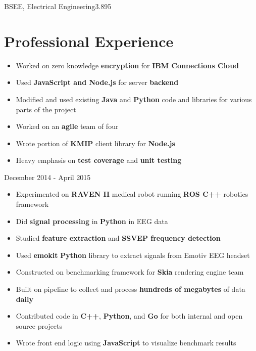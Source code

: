 \documentclass{my_resume}
\begin{document}

	{BSEE, Electrical Engineering}{3.895}

\section{Professional Experience}
\begin{itemize}
	\item Worked on zero knowledge \textbf{encryption} for 
		\textbf{IBM Connections Cloud}
	\item Used \textbf{JavaScript and Node.js} for server \textbf{backend}
	\item Modified and used existing \textbf{Java} and \textbf{Python} code
		and libraries for various parts of the project
	\item Worked on an \textbf{agile} team of four
	\item Wrote portion of \textbf{KMIP} client library for \textbf{Node.js}
    \item Heavy emphasis on \textbf{test coverage} and \textbf{unit testing}
\end{itemize}
	{December 2014 - April 2015}
\begin{itemize}
	\item Experimented on \textbf{RAVEN II} medical robot running \textbf{ROS C++}
		robotics framework
	\item Did \textbf{signal processing} in \textbf{Python} in EEG data
	\item Studied \textbf{feature extraction} and \textbf{SSVEP frequency detection}
	\item Used \textbf{emokit} \textbf{Python} library to extract signals from
		Emotiv EEG headset
\end{itemize}
\begin{itemize}
	\item Constructed on benchmarking framework for \textbf{Skia} rendering engine team
    \item Built on pipeline to collect and process \textbf{hundreds of megabytes} of data \textbf{daily}
	\item Contributed code in \textbf{C++}, \textbf{Python}, and \textbf{Go} for
		both internal and open source projects
	\item Wrote front end logic using \textbf{JavaScript} to visualize benchmark results
\end{itemize}
\end{document}
